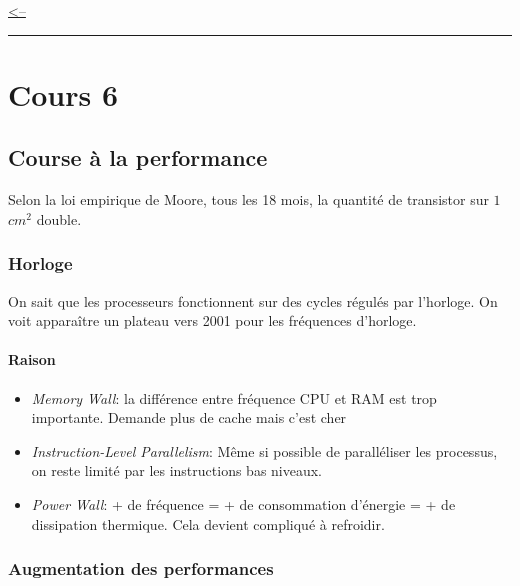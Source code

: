 \href{../README.md}{\textless--}

\begin{center}\rule{0.5\linewidth}{0.5pt}\end{center}

\section{Cours 6}\label{cours-6}

\subsection{Course à la performance}\label{course-uxe0-la-performance}

Selon la loi empirique de Moore, tous les 18 mois, la quantité de
transistor sur \(1\) \(cm^2\) double.

\subsubsection{Horloge}\label{horloge}

On sait que les processeurs fonctionnent sur des cycles régulés par
l'horloge. On voit apparaître un plateau vers 2001 pour les fréquences
d'horloge.

\paragraph{Raison}\label{raison}

\begin{itemize}
\tightlist
\item
  \emph{Memory Wall}: la différence entre fréquence CPU et RAM est trop
  importante. Demande plus de cache mais c'est cher
\item
  \emph{Instruction-Level Parallelism}: Même si possible de paralléliser
  les processus, on reste limité par les instructions bas niveaux.
\item
  \emph{Power Wall}: + de fréquence = + de consommation d'énergie = + de
  dissipation thermique. Cela devient compliqué à refroidir.
\end{itemize}

\subsubsection{Augmentation des
performances}\label{augmentation-des-performances}

